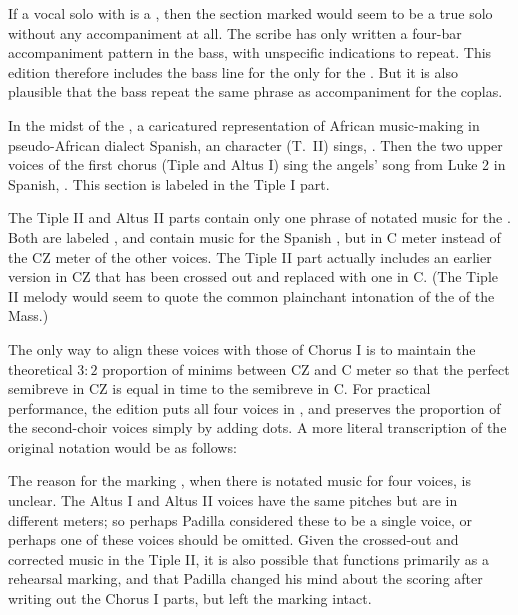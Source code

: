 If a vocal solo with  is a , then the section marked  would seem to be a true solo without any accompaniment at all.
The scribe has only written a four-bar accompaniment pattern in the bass, with unspecific indications to repeat.
This edition therefore includes the bass line for the  only for the .
But it is also plausible that the bass repeat the same phrase as accompaniment for the coplas.


In the midst of the , a caricatured representation of African music-making in pseudo-African dialect Spanish, an  character (T.~II) sings, .
Then the two upper voices of the first chorus (Tiple and Altus I) sing the angels' song from Luke 2 in Spanish, .
This section is labeled  in the Tiple I part.

The Tiple II and Altus II parts contain only one phrase of notated music for the .
Both are labeled , and contain music for the Spanish , but in C meter instead of the CZ meter of the other voices.
The Tiple II part actually includes an earlier version in CZ that has been crossed out and replaced with one in C.
(The Tiple II melody would seem to quote the common plainchant intonation of the  of the Mass.)

The only way to align these voices with those of Chorus I is to maintain the theoretical $3:2$ proportion of minims between CZ and C meter so that the perfect semibreve in CZ is equal in time to the semibreve in C.
For practical performance, the edition puts all four voices in , and preserves the proportion of the second-choir voices simply by adding dots.
A more literal transcription of the original notation would be as follows:


The reason for the marking , when there is notated music for four voices, is unclear.
The Altus I and Altus II voices have the same pitches but are in different meters; so perhaps Padilla considered these to be a single voice, or perhaps one of these voices should be omitted.
Given the crossed-out and corrected music in the Tiple II, it is also possible that  functions primarily as a rehearsal marking, and that Padilla changed his mind about the scoring after writing out the Chorus I parts, but left the marking intact.

